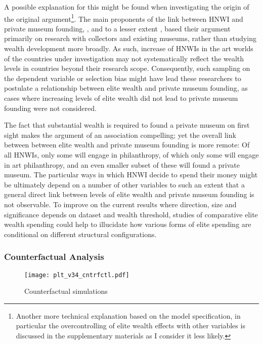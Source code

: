\documentclass[11pt, authoryear]{elsarticle}
\begin{document}
A possible explanation for this might be found when investigating the origin of the original argument\footnote{Another more technical explanation based on the model specification, in particular the overcontrolling of elite wealth effects with other variables is discussed in the supplementary materials as I consider it less likely.}.
The main proponents of the link between HNWI and private museum founding, \citet{Gnyp_2015_collectors}, \citet{Zorloni_Resch_2016_opportunities} and to a lesser extent \citet{Walker_2019_collector}, based their argument primarily on research with collectors and existing museums, rather than studying wealth development more broadly.
As such, increase of HNWIs in the art worlds of the countries under investigation may not systematically reflect the wealth levels in countries beyond their research scope.  
Consequently, such sampling on the dependent variable or selection bias might have lead these researchers to postulate a relationship between elite wealth and private museum founding, as cases where increasing levels of elite wealth did not lead to private museum founding were not considered. 


The fact that substantial wealth is required to found a private museum on first sight makes the argument of an association compelling; yet the overall link between between elite wealth and private museum founding is more remote: 
Of all HNWIs, only some will engage in philanthropy, of which only some will engage in art philanthropy, and  an even smaller subset of these will found a private museum.
The particular ways in which HNWI decide to spend their money might be ultimately depend on a number of other variables to such an extent that a general direct link between levels of elite wealth and private museum founding is not observable.
To improve on the current results where direction, size and significance depends on dataset and wealth threshold, studies of comparative elite wealth spending could help to illucidate how various forms of elite spending are conditional on different structural configurations.








\subsubsection*{Counterfactual Analysis}

\begin{figure}[htbp]
\centering
\texttt{[image: plt\_v34\_cntrfctl.pdf]}
\caption{\label{fig:cntrfctl}Counterfactual simulations}
\end{figure}
\end{document}

